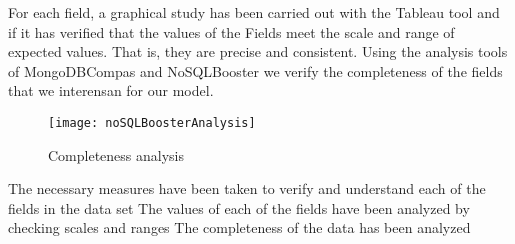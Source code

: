 For each field, a graphical study has been carried out with the Tableau tool and if it has verified that the values of the
Fields meet the scale and range of expected values. That is, they are precise and consistent.
Using the analysis tools of MongoDBCompas and NoSQLBooster we verify the completeness of the fields that we
interensan for our model.
\begin{figure}[ht]
    \centering
    \texttt{[image: noSQLBoosterAnalysis]}
    \caption{Completeness analysis}
\end{figure}

\begin{itemize}
    \done The necessary measures have been taken to verify and understand each of the fields in the data set
    \done The values of each of the fields have been analyzed by checking scales and ranges
    \done The completeness of the data has been analyzed
    
\end{itemize}
 \newpage